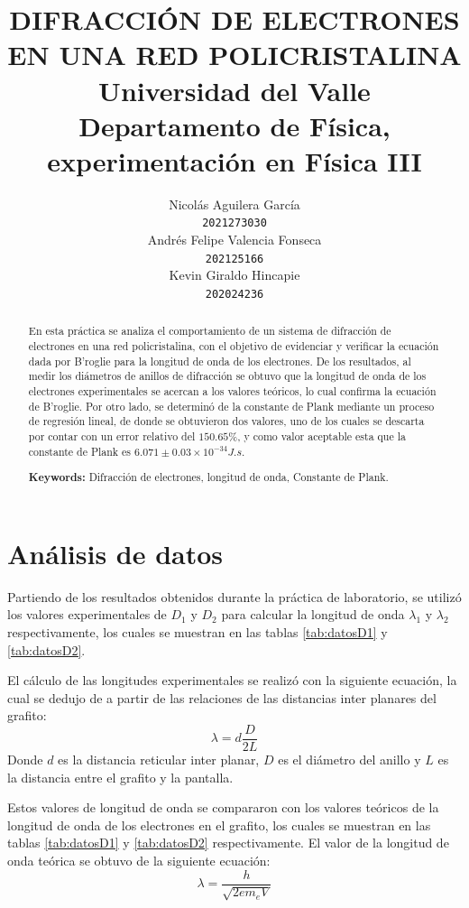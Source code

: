 \documentclass[10pt]{article}
\title{
    DIFRACCIÓN DE ELECTRONES EN UNA RED POLICRISTALINA\\
    Universidad del Valle \\
    Departamento de Física, experimentación en Física III
}
\author{
    Nicolás Aguilera García \\
    {\tt 2021273030} \\
    \And
    Andrés Felipe Valencia Fonseca \\
    {\tt 202125166} \\
    \And 
    Kevin Giraldo Hincapie\\
    {\tt 202024236} \\
}
\date{}
\begin{document}
    \maketitle

    \begin{abstract}
        En esta práctica se analiza el comportamiento de un sistema de difracción de electrones en una red policristalina, con el objetivo de evidenciar y verificar la ecuación dada por B’roglie para la longitud de onda de los electrones. De los resultados, al medir los diámetros de anillos de difracción se obtuvo que la longitud de onda de los electrones experimentales se acercan a los valores teóricos, lo cual confirma la ecuación de B’roglie.
        Por otro lado, se determinó de la constante de Plank mediante un proceso de regresión lineal, de donde se obtuvieron dos valores, uno de los cuales se descarta por contar con un error relativo del $150.65\%$, y como valor aceptable esta que la constante de Plank es $6.071 \pm 0.03 \times 10^{-34} J.s$.


        {\bf Keywords: } Difracción de electrones, longitud de onda, Constante de Plank.
    \end{abstract}


    \section{Análisis de datos}
    Partiendo de los resultados obtenidos durante la práctica de laboratorio, se utilizó los valores experimentales de $D_1$ y $D_2$ para calcular la longitud de onda $\lambda_1$ y $\lambda_2$ respectivamente, los cuales se muestran en las tablas \ref{tab:datosD1} y \ref{tab:datosD2}.

    El cálculo de las longitudes experimentales se realizó con la siguiente ecuación, la cual se dedujo de a partir de las relaciones de las distancias inter planares del grafito:
    \begin{equation}
        \lambda = d\frac{D}{2L}
    \end{equation}
    Donde $d$ es la distancia reticular inter planar, $D$ es el diámetro del anillo y $L$ es la distancia entre el grafito y la pantalla.

    Estos valores de longitud de onda se compararon con los valores teóricos de la longitud de onda de los electrones en el grafito, los cuales se muestran en las tablas \ref{tab:datosD1} y \ref{tab:datosD2} respectivamente. El valor de la longitud de onda teórica se obtuvo de la siguiente ecuación:
    \begin{equation}
        \lambda = \frac{h}{\sqrt{2em_eV}}
    \end{equation}
\end{document}

